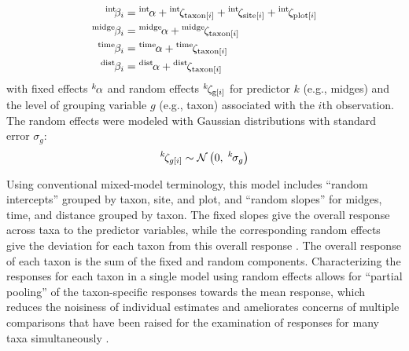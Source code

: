 \begin{equation} \label{eq:betas}
\begin{split}
    {}^\text{int}\hspace*{-2pt}\beta_i &= {}^\text{int}\hspace*{-1pt}\alpha +
        {}^\text{int}\hspace*{-1pt}\zeta_{\text{taxon}[i]} +
        {}^\text{int}\hspace*{-1pt}\zeta_{\text{site}[i]} +
        {}^\text{int}\hspace*{-1pt}\zeta_{\text{plot}[i]} \\
    {}^\text{midge}\hspace*{-1pt}\beta_i &= {}^\text{midge}\hspace*{-1pt}\alpha +
            {}^\text{midge}\hspace*{-1pt}\zeta_{\text{taxon}[i]} \\
    {}^\text{time}\hspace*{-1pt}\beta_i &= {}^\text{time}\hspace*{-1pt}\alpha +
            {}^\text{time}\hspace*{-1pt}\zeta_{\text{taxon}[i]} \\
    {}^\text{dist}\hspace*{-1pt}\beta_i &= {}^\text{dist}\hspace*{-1pt}\alpha +
            {}^\text{dist}\hspace*{-1pt}\zeta_{\text{taxon}[i]}
\end{split}
\end{equation}
%
\noindent with fixed effects ${}^k\hspace*{-1pt}\alpha$ and random effects
${}^k\hspace*{-1pt}\zeta_{\text{g}[i]}$ for predictor $k$ (e.g., midges)
and the level of grouping variable $g$ (e.g., taxon) associated  with the $i$th observation.
The random effects were modeled with Gaussian distributions with
standard error $\sigma_g$:
%
\begin{equation} \label{eq:zetas}
    {}^k\hspace*{-1pt}\zeta_{g[i]} \sim
        \mathcal{N}\left(0, \; {}^k\hspace*{-1pt}\sigma_g \right)
\end{equation}

Using conventional mixed-model terminology, this model includes ``random intercepts''
grouped by taxon, site, and plot, and ``random slopes'' for midges,
time, and distance grouped by taxon.
The fixed slopes give the overall response across taxa to the predictor variables,
while the corresponding random effects give the deviation for each taxon from
this overall response \citep{Jackson2012}.
The overall response of each taxon is the sum of the fixed and random components.
Characterizing the responses for each taxon in a single model using random effects
allows for ``partial pooling'' of the taxon-specific responses towards the mean response,
which reduces the noisiness of individual estimates and ameliorates concerns of
multiple comparisons \citep{Gelman2012} that have been raised
for the examination of responses for many taxa simultaneously \citep{Mcgarigal2013}.


